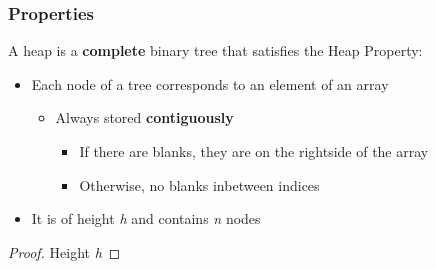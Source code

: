 \documentclass[10pt, 
a4paper, 
oneside, 
headinclude, footinclude, 
BCOR5mm]
{scrartcl}
\begin{document}
\subsubsection{Properties}
A heap is a \textbf{complete} binary tree that satisfies the Heap Property:
\begin{itemize}
    \item Each node of a tree corresponds to an element of an array
    \begin{itemize}
        \item Always stored \textbf{contiguously}
        \begin{itemize}
            \item  If there are blanks, they are on the rightside of the array
            \item  Otherwise, no blanks inbetween indices
        \end{itemize}
    \end{itemize}
    \item It is of height \textit{h} and contains \textit{n} nodes
\end{itemize}

\begin{proof}
    Height \textit{h}
\end{proof}
\BlankLine
\end{document}
